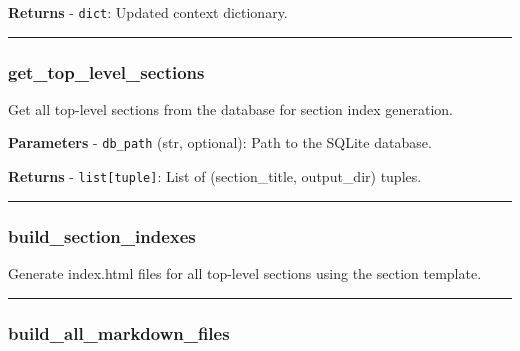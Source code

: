 \textbf{Returns} - \texttt{dict}: Updated context dictionary.

\begin{center}\rule{0.5\linewidth}{0.5pt}\end{center}

\subsubsection{get\_top\_level\_sections}\label{get_top_level_sections}

\begin{Shaded}
\begin{Highlighting}[]
\OperatorTok{=}\NormalTok{)}
\end{Highlighting}
\end{Shaded}

Get all top-level sections from the database for section index
generation.

\textbf{Parameters} - \texttt{db\_path} (str, optional): Path to the
SQLite database.

\textbf{Returns} - \texttt{list{[}tuple{]}}: List of (section\_title,
output\_dir) tuples.

\begin{center}\rule{0.5\linewidth}{0.5pt}\end{center}

\subsubsection{build\_section\_indexes}\label{build_section_indexes}

\begin{Shaded}
\begin{Highlighting}[]
\end{Highlighting}
\end{Shaded}

Generate index.html files for all top-level sections using the section
template.

\begin{center}\rule{0.5\linewidth}{0.5pt}\end{center}

\subsubsection{build\_all\_markdown\_files}\label{build_all_markdown_files}

